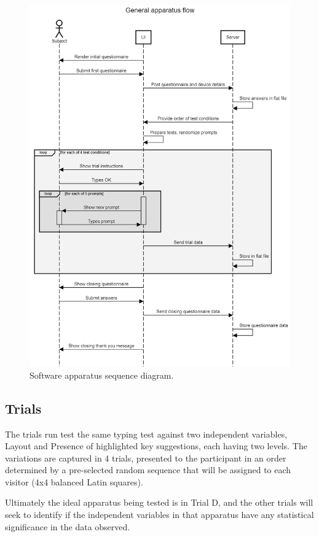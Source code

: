 \documentclass[english]{vgtc}
\begin{document}
\begin{figure}
  \centering
  \includegraphics[width=1.1\columnwidth]{Sequence-light.png}
  \caption{Software apparatus sequence diagram.}
  \label{fig:sequence}
\end{figure}

\subsection{Trials}

The trials run test the same typing test against two independent
variables, Layout and Presence of highlighted key suggestions, each
having two levels. The variations are captured in 4 trials, presented 
to the participant in an order determined by a pre-selected
random sequence that will be assigned to each visitor (4x4 balanced Latin squares).

Ultimately the ideal apparatus being tested is in Trial D, and the
other trials will seek to identify if the independent variables in
that apparatus have any statistical significance in the data observed.
\end{document}
